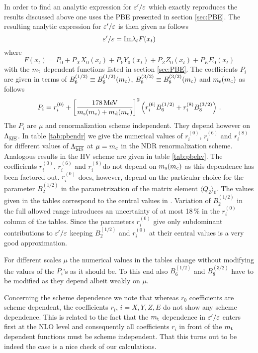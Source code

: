 In order to find an analytic expression for $\varepsilon'/\varepsilon$ which exactly
reproduces the results discussed above one uses the PBE presented in
section \ref{sec:PBE}. The resulting analytic expression for $\varepsilon'/\varepsilon$ is
then given as follows
\begin{equation}
\varepsilon'/\varepsilon =
{\rm Im} \lambda_t F(x_t)
\label{eq:epePBE}
\end{equation}
where
\begin{equation}
F(x_t) = P_0 + P_X X_0(x_t) + P_Y Y_0(x_t) + P_Z Z_0(x_t) + P_E E_0(x_t)
\label{eq:Fxt}
\end{equation}
with the $m_{\rm t}$ dependent functions listed in section \ref{sec:PBE}. The
coefficients $P_i$ are given in terms of $B_6^{(1/2)} \equiv
B_6^{(1/2)}(m_{\rm c})$, $B_8^{(3/2)} \equiv B_8^{(3/2)}(m_{\rm c})$ and $m_{\rm s}(m_{\rm c})$
as follows
\begin{equation}
P_i = r_i^{(0)} + \left[ \frac{178\, {\rm MeV}}{m_{\rm s}(m_{\rm c})+m_{\rm d}(m_{\rm c})} \right]^2
\left(r_i^{(6)} B_6^{(1/2)} + r_i^{(8)} B_8^{(3/2)} \right) \, .
\label{eq:pbePi}
\end{equation}
The $P_i$ are $\mu$ and renormalization scheme independent. They depend
however on $\Lambda_{\overline{\rm MS}}$. In table \ref{tab:pbendr} we give the numerical
values of $r_i^{(0)}$, $r_i^{(6)}$ and $r_i^{(8)}$ for different values
of $\Lambda_{\overline{\rm MS}}$ at $\mu=m_{\rm c}$ in the NDR renormalization scheme. Analogous
results in the HV scheme are given in table \ref{tab:pbehv}. The
coefficients $r_i^{(0)}$, $r_i^{(6)}$ and $r_i^{(8)}$do not depend on
$m_{\rm s}(m_{\rm c})$ as this dependence has been factored out. $r_i^{(0)}$ does,
however, depend on the particular choice for the parameter
$B_2^{(1/2)}$ in the parametrization of the matrix element $\langle Q_2
\rangle_0$. The values given in the tables correspond to the central
values in . Variation of $B_2^{(1/2)}$ in the full
allowed range introduces an uncertainty of at most 18\,\% in the
$r_i^{(0)}$ column of the tables.  Since the parameters $r_i^{(0)}$
give only subdominant contributions to $\varepsilon'/\varepsilon$ keeping $B_2^{(1/2)}$ and
$r_i^{(0)}$ at their central values is a very good approximation.

For different scales $\mu$ the numerical values in the tables change
without modifying the values of the $P_i$'s as it should be. To this
end also $B_6^{(1/2)}$ and $B_8^{(3/2)}$ have to be modified as they
depend albeit weakly on $\mu$.

Concerning the scheme dependence we note that whereas $r_0$ coefficients
are scheme dependent, the coefficients $r_i$, $i=X, Y, Z, E$ do not show
any scheme dependence. This is related to the fact that the $m_{\rm t}$
dependence in $\varepsilon'/\varepsilon$ enters first at the NLO level and consequently all
coefficients $r_i$ in front of the $m_{\rm t}$ dependent functions must be
scheme independent. That this turns out to be indeed the case is a nice
check of our calculations.


